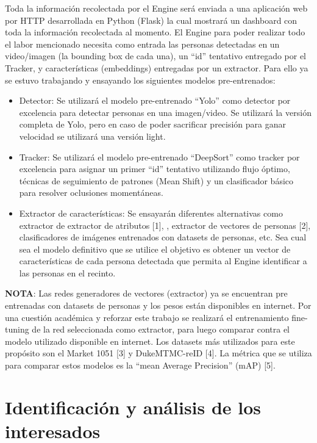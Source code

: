 \documentclass[11pt]{charter}
\begin{document}
\newpage

Toda la información recolectada por el Engine será enviada a una aplicación web por HTTP desarrollada en Python (Flask) la cual mostrará un dashboard con toda la información recolectada al momento. El Engine para poder realizar todo el labor mencionado necesita como entrada las personas detectadas en un video/imagen (la bounding box de cada una), un “id” tentativo entregado por el Tracker, y características (embeddings)  entregadas por un extractor. Para ello ya se estuvo trabajando y ensayando los siguientes modelos pre-entrenados:

\begin{itemize}
\item Detector: Se utilizará el modelo pre-entrenado “Yolo” como detector por excelencia para detectar personas en una imagen/video. Se utilizará la versión completa de Yolo, pero en caso de poder sacrificar precisión para ganar velocidad se utilizará una versión light.
\item Tracker: Se utilizará el modelo pre-entrenado “DeepSort” como tracker por excelencia para asignar un primer “id” tentativo utilizando flujo óptimo, técnicas de seguimiento de patrones (Mean Shift) y un clasificador básico para resolver oclusiones momentáneas.
\item Extractor de características: Se ensayarán diferentes alternativas como extractor de extractor  de atributos [1], , extractor de vectores de personas [2], clasificadores de imágenes entrenados con datasets de personas, etc. Sea cual sea el modelo definitivo que se utilice el objetivo es obtener un vector de características de cada persona detectada que permita al Engine identificar a las personas en el recinto.
\end{itemize}

\textbf{NOTA}: Las redes generadores de vectores (extractor) ya se encuentran pre entrenadas con datasets de personas y los pesos están disponibles en internet. Por una cuestión académica y reforzar este trabajo se realizará el entrenamiento fine-tuning de la red seleccionada como extractor, para luego comparar contra el modelo utilizado disponible en internet. Los datasets más utilizados para este propósito son el Market 1051 [3] y DukeMTMC-reID [4]. La métrica que se utiliza para comparar estos modelos es la “mean Average Precision” (mAP) [5].


\section{Identificación y análisis de los interesados}
\label{sec:interesados}
\end{document}
